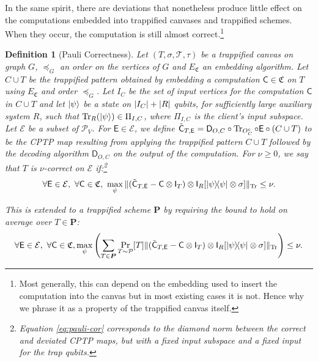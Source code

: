 \documentclass[12pt]{iopart}
\newcommand{\cptp}[1]{\mathsf{#1}} \newcommand{\pd}[1]{\mathcal{#1}}  \newcommand{\sch}[1]{\bm{#1}}
\newcommand{\Id}{\cptp{I}}
\renewcommand{\1}{\mathds{1}}
\newcommand{\TP}{C\cup T}
\newcommand{\Deco}{\cptp D_{O, C}}
\newcommand{\Cdev}[1]{\tilde{\cptp C}_{T, #1}}
\newtheorem{definition}{Definition}
\begin{document}
In the same spirit, there are deviations that nonetheless produce little effect on the computations embedded into trappified canvases and trappified schemes. When they occur, the computation is still almost correct.\footnote{Most generally, this can depend on the embedding used to insert the computation into the canvas but in most existing cases it is not. Hence why we phrase it as a property of the trappified canvas itself.}

\begin{definition}[Pauli Correctness]
\label{def:trap-cor}
  Let $(T, \sigma, \pd T, \tau)$ be a trappified canvas on graph $G$, $\preceq_G$ an order on the vertices of $G$ and $E_{\mathfrak C}$ an embedding algorithm. Let $\TP$ be the trappified pattern obtained by embedding a computation $\cptp C \in \mathfrak{C}$ on $T$ using $E_{\mathfrak C}$ and order $\preceq_G$. Let $I_C$ be the set of input vertices for the computation $\cptp C$ in $\TP$ and let $\ket{\psi}$ be a state on $\abs{I_C}+\abs{R}$ qubits, for sufficiently large auxiliary system $R$, such that $\Tr_R(\ket{\psi}) \in \Pi_{I,C}$, where $\Pi_{I,C}$ is the client's input subspace.
  Let $\mathcal E$ be a subset of  $\mathcal P_V$. For $\cptp E \in \mathcal{E}$, we define $\Cdev{\cptp E} = \Deco\circ\Tr_{O_C^c}\circ\cptp E\circ (\TP)$ to be the CPTP map resulting from applying the trappified pattern $\TP$ followed by the decoding algorithm $\Deco$ on the output of the computation.
  For $\nu \geq 0$, we say that $T$ is \emph{$\nu$-correct} on $\mathcal E$ if:\footnote{Equation \ref{eq:pauli-cor} corresponds to the diamond norm between the correct and deviated CPTP maps, but with a fixed input subspace and a fixed input for the trap qubits.}
  \begin{align}
  \label{eq:pauli-cor}
     \forall \cptp E \in \mathcal E, \ \forall \cptp C \in \mathfrak{C}, \ \max_\psi\| (\Cdev{\cptp E}  - \cptp C\otimes \Id_T)\otimes\Id_R [\dyad{\psi} \otimes \sigma]\|_{\Tr} \leq \nu.
  \end{align}

\noindent This is extended to a trappified scheme $\sch P$ by requiring the bound to hold on average over $T \in \sch P$:
\begin{equation}
\forall \cptp E \in \mathcal E, \ \forall \cptp C \in \mathfrak{C}, \max_\psi \left(\sum_{T\in \sch P} \Pr_{T\sim \pd P}[T] \| (\Cdev{\cptp E}  - \cptp C\otimes \Id_T)\otimes\Id_R [\dyad{\psi} \otimes \sigma]\|_{\Tr}  \right) \leq \nu.
\end{equation}
\end{definition}
\end{document}
